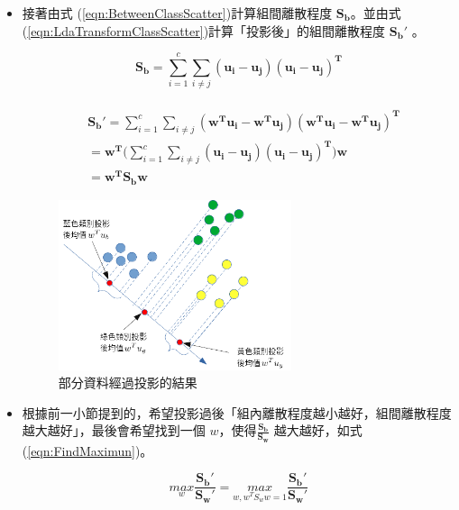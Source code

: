 \begin{itemize}
	\item
		接著由式 (\ref{eqn:BetweenClassScatter})計算組間離散程度 \(\mathbf{S_b}\)。並由式 (\ref{eqn:LdaTransformClassScatter})計算「投影後」的組間離散程度 \(\mathbf{{S_b}'}\) 。

	      \begin{equation}
		      \label{eqn:BetweenClassScatter}
		      \mathbf{S_b} =\sum_{i=1}^{c}\sum_{i \neq j } \mathbf{(u_i - u_j)(u_i - u_j)^T}
	      \end{equation}

	      \begin{equation}
		      \label{eqn:LdaTransformClassScatter}
		      \begin{aligned}
			      \\&\mathbf{{S_b}'} =\sum_{i=1}^{c}\sum_{i \neq j } \mathbf{(w^Tu_i - w^Tu_j)(w^Tu_i - w^Tu_j)^T}
			      \\& =\mathbf{w^T}(\sum_{i=1}^{c}\sum_{i \neq j } \mathbf{(u_i - u_j)(u_i - u_j)^T)w}
			      \\& =\mathbf{w^TS_bw}
		      \end{aligned}
	      \end{equation}



	      \begin{figure}[H]
		      \centering
		      \includegraphics[height=5cm]{./pic/0JcYc52J.png}
		      \caption{部分資料經過投影的結果}
		      \label{fig:LdaTransform}
	      \end{figure}

	\item
	      根據前一小節提到的，希望投影過後「組內離散程度越小越好，組間離散程度越大越好」，最後會希望找到一個 \(w\)，使得\(\frac{\mathbf{S_b}}{\mathbf{S_w}}\) 越大越好，如式(\ref{eqn:FindMaximun})。

	      \begin{equation}
		      \label{eqn:FindMaximun}
		      \underset{w}{max}\frac{\mathbf{{S_b}'}}{\mathbf{{S_w}'}} =\underset{w,w^TS_ww = 1}{max}\frac{\mathbf{{S_b}'}}{\mathbf{{S_w}'}}
	      \end{equation}



\end{itemize}
